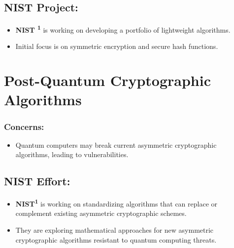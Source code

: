 \subsection{NIST Project:}
\begin{itemize}
    \item \textbf{NIST \textsuperscript{1}} is working on developing a portfolio of lightweight algorithms.
    \item Initial focus is on symmetric encryption and secure hash functions.
\end{itemize}

\section{Post-Quantum Cryptographic Algorithms}

\subsubsection{Concerns:}
\begin{itemize}
    \item Quantum computers may break current asymmetric cryptographic algorithms, leading to vulnerabilities.
\end{itemize}

\subsection{NIST Effort:}
\begin{itemize}
    \item \textbf{NIST\textsuperscript{1}} is working on standardizing algorithms that can replace or complement existing asymmetric cryptographic schemes.
    \item They are exploring mathematical approaches for new asymmetric cryptographic algorithms resistant to quantum computing threats.
\end{itemize}


